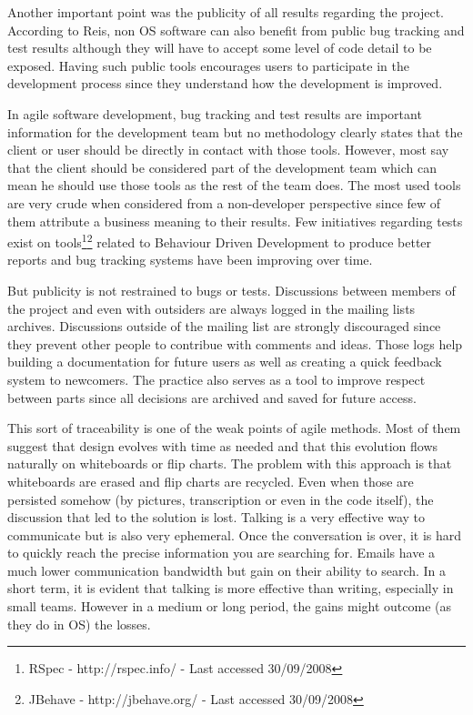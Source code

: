 Another important point was the publicity of all results regarding the
project. According to Reis, non OS software can also benefit from
public bug tracking and test results although they will have to accept
some level of code detail to be exposed. Having such public tools
encourages users to participate in the development process since they
understand how the development is improved.

In agile software development, bug tracking and test results are
important information for the development team but no methodology
clearly states that the client or user should be directly in contact
with those tools. However, most say that the client should be
considered part of the development team which can mean he should use
those tools as the rest of the team does. The most used tools are very
crude when considered from a non-developer perspective since few of
them attribute a business meaning to their results. Few initiatives
regarding tests exist on tools\footnote{RSpec - http://rspec.info/ -
  Last accessed 30/09/2008}\footnote{JBehave - http://jbehave.org/ -
  Last accessed 30/09/2008} related to Behaviour Driven Development
\cite{North2006} to produce better reports and bug tracking systems
have been improving over time.

But publicity is not restrained to bugs or tests. Discussions between
members of the project and even with outsiders are always logged in
the mailing lists archives. Discussions outside of the mailing list
are strongly discouraged since they prevent other people to contribue
with comments and ideas.  Those logs help building a documentation for
future users as well as creating a quick feedback system to
newcomers. The practice also serves as a tool to improve respect
between parts since all decisions are archived and saved for future
access.

This sort of traceability is one of the weak points of agile
methods. Most of them suggest that design evolves with time as needed
and that this evolution flows naturally on whiteboards or flip
charts. The problem with this approach is that whiteboards are erased
and flip charts are recycled. Even when those are persisted somehow
(by pictures, transcription or even in the code itself), the
discussion that led to the solution is lost. Talking is a very
effective way to communicate but is also very ephemeral. Once the
conversation is over, it is hard to quickly reach the precise
information you are searching for. Emails have a much lower
communication bandwidth but gain on their ability to search. In a
short term, it is evident that talking is more effective than writing,
especially in small teams. However in a medium or long period, the
gains might outcome (as they do in OS) the losses.

